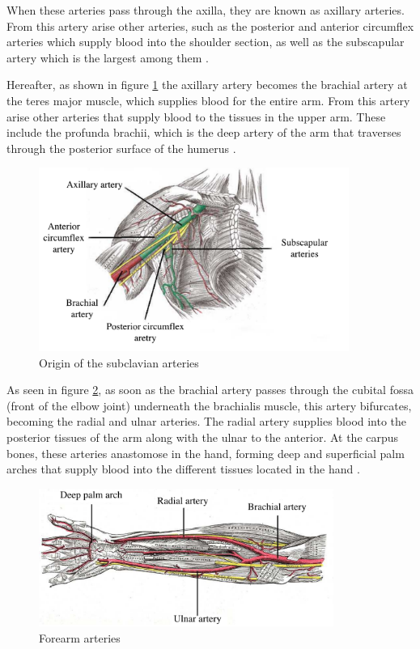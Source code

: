 When these arteries pass through the axilla, they are known as axillary arteries. From this artery arise other arteries, such as the posterior and anterior circumflex arteries which supply blood into the shoulder section, as well as the subscapular artery which is the largest among them \cite{scanlon2014essentials}. 

Hereafter, as shown in figure \ref{fig:upper arm circulation} the axillary artery becomes the brachial artery at the teres major muscle, which supplies blood for the entire arm.  From this artery arise other arteries that supply blood to the tissues in the upper arm. These include the profunda brachii, which is the deep artery of the arm that traverses through the posterior surface of the humerus \cite{scanlon2014essentials}. 

\begin{figure}[!htpb]
	\centering
	\includegraphics[height=6cm,keepaspectratio]{figure19}
	\caption{Origin of the subclavian arteries}
	\label{fig:upper arm circulation}
\end{figure}

As seen in figure \ref{fig:forearm aretries}, as soon as the brachial artery passes through the cubital fossa (front of the elbow joint) underneath the brachialis muscle, this artery bifurcates, becoming the radial and ulnar arteries. The radial artery supplies blood into the posterior tissues of the arm along with the ulnar to the anterior. At the carpus bones, these arteries anastomose in the hand, forming deep and superficial palm arches that supply blood into the different tissues located in the hand \cite{scanlon2014essentials}. 

\begin{figure}[!htpb]
	\centering
	\includegraphics[height=4.5cm,keepaspectratio]{figure20}
	\caption{Forearm arteries}
	\label{fig:forearm aretries}
\end{figure}

